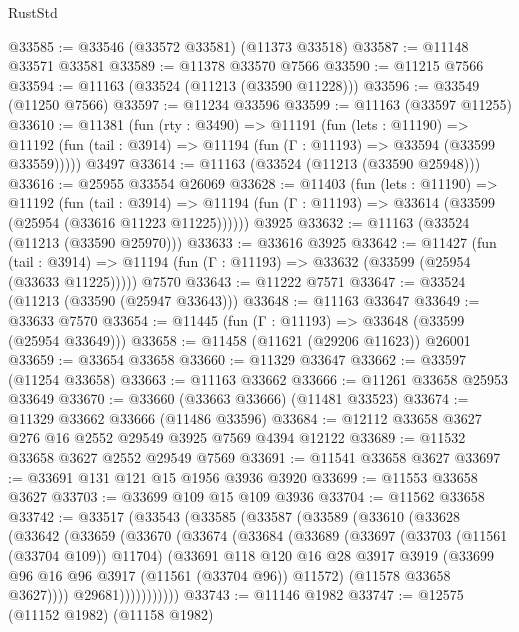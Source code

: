 \begin{lexlean}{RustStd}
\begin{coremodule}
@33585 := @33546 (@33572 @33581) (@11373 @33518)
@33587 := @11148 @33571 @33581
@33589 := @11378 @33570 @7566
@33590 := @11215 @7566
@33594 := @11163 (@33524 (@11213 (@33590 @11228)))
@33596 := @33549 (@11250 @7566)
@33597 := @11234 @33596
@33599 := @11163 (@33597 @11255)
@33610 := @11381
    (fun (rty : @3490) =>
    @11191
      (fun (lets : @11190) =>
      @11192 (fun (tail : @3914) => @11194 (fun (Γ : @11193) => @33594 (@33599 @33559)))))
    @3497
@33614 := @11163 (@33524 (@11213 (@33590 @25948)))
@33616 := @25955 @33554 @26069
@33628 := @11403
    (fun (lets : @11190) =>
    @11192
      (fun (tail : @3914) =>
      @11194 (fun (Γ : @11193) => @33614 (@33599 (@25954 (@33616 @11223 @11225))))))
    @3925
@33632 := @11163 (@33524 (@11213 (@33590 @25970)))
@33633 := @33616 @3925
@33642 := @11427
    (fun (tail : @3914) => @11194 (fun (Γ : @11193) => @33632 (@33599 (@25954 (@33633 @11225)))))
    @7570
@33643 := @11222 @7571
@33647 := @33524 (@11213 (@33590 (@25947 @33643)))
@33648 := @11163 @33647
@33649 := @33633 @7570
@33654 := @11445 (fun (Γ : @11193) => @33648 (@33599 (@25954 @33649)))
@33658 := @11458 (@11621 (@29206 @11623)) @26001
@33659 := @33654 @33658
@33660 := @11329 @33647
@33662 := @33597 (@11254 @33658)
@33663 := @11163 @33662
@33666 := @11261 @33658 @25953 @33649
@33670 := @33660 (@33663 @33666) (@11481 @33523)
@33674 := @11329 @33662 @33666 (@11486 @33596)
@33684 := @12112 @33658 @3627 @276 @16 @2552 @29549 @3925 @7569 @4394 @12122
@33689 := @11532 @33658 @3627 @2552 @29549 @7569
@33691 := @11541 @33658 @3627
@33697 := @33691 @131 @121 @15 @1956 @3936 @3920
@33699 := @11553 @33658 @3627
@33703 := @33699 @109 @15 @109 @3936
@33704 := @11562 @33658
@33742 := @33517
    (@33543
      (@33585
        (@33587
          (@33589
            (@33610
              (@33628
                (@33642
                  (@33659
                    (@33670
                      (@33674
                        (@33684
                          (@33689
                            (@33697
                              (@33703 (@11561 (@33704 @109)) @11704)
                              (@33691
                                @118
                                @120
                                @16
                                @28
                                @3917
                                @3919
                                (@33699 @96 @16 @96 @3917 (@11561 (@33704 @96)) @11572)
                                (@11578 @33658 @3627))))
                          @29681)))))))))))
@33743 := @11146 @1982
@33747 := @12575 (@11152 @1982) (@11158 @1982)

\end{coremodule}
\end{lexlean}
